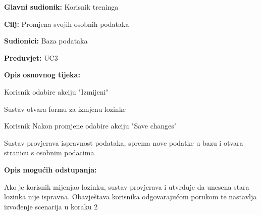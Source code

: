 				\noindent {}				\begin{packed_item}
						
						\item \textbf{Glavni sudionik: }Korisnik treninga
						\item  \textbf{Cilj:} Promjena svojih osobnih podataka
						\item  \textbf{Sudionici:} Baza podataka
						\item  \textbf{Preduvjet:} UC3
						\item  \textbf{Opis osnovnog tijeka:}
						
						\item[] \begin{packed_enum}

							
							\item Korisnik odabire akciju "Izmijeni"
							\item Sustav otvara formu za izmjenu lozinke
							\item Korisnik Nakon promjene odabire akciju "Save changes" 
							\item Sustav provjerava ispravnost podataka, sprema nove podatke u bazu i otvara stranicu s osobnim podacima

							
						\end{packed_enum}
						
						\item  \textbf{Opis mogućih odstupanja:}
						
						\begin{packed_enum}
							
							\item[4.a] Ako je korisnik mijenjao lozinku, sustav provjerava i utvrđuje da unesena stara lozinka nije ispravna. Obavještava korisnika odgovarajućom porukom te nastavlja izvođenje scenarija u koraku 2
							
						\end{packed_enum}
						
					\end{packed_item}
				
